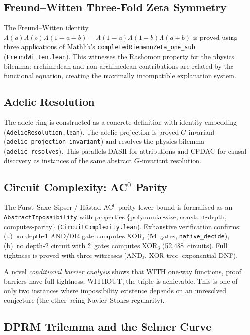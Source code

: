 \documentclass[11pt,a4paper]{article}
\begin{document}
\subsection{Freund--Witten Three-Fold Zeta Symmetry}

The Freund--Witten identity
$\Lambda(a)\Lambda(b)\Lambda(1{-}a{-}b) = \Lambda(1{-}a)\Lambda(1{-}b)\Lambda(a{+}b)$
is proved using three applications of Mathlib's \texttt{completedRiemannZeta\_one\_sub} (\texttt{FreundWitten.lean}).  This witnesses the Rashomon property for the physics bilemma: archimedean and non-archimedean contributions are related by the functional equation, creating the maximally incompatible explanation system.

\subsection{Adelic Resolution}

The adele ring is constructed as a concrete definition with identity embedding (\texttt{AdelicResolution.lean}).  The adelic projection is proved $G$-invariant (\texttt{adelic\_projection\_invariant}) and resolves the physics bilemma (\texttt{adelic\_resolves}).  This parallels DASH for attributions and CPDAG for causal discovery as instances of the same abstract $G$-invariant resolution.

\subsection{Circuit Complexity: AC$^0$ Parity}

The Furst--Saxe--Sipser / H\aa stad AC$^0$ parity lower bound is formalised as an \texttt{AbstractImpossibility} with properties \{polynomial-size, constant-depth, computes-parity\} (\texttt{CircuitComplexity.lean}).  Exhaustive verification confirms: (a)~no depth-1 AND/OR gate computes XOR$_3$ (54~gates, \texttt{native\_decide}); (b)~no depth-2 circuit with 2~gates computes XOR$_3$ (52,488~circuits).  Full tightness is proved with three witnesses (AND$_3$, XOR tree, exponential DNF).

A novel \emph{conditional barrier analysis} shows that WITH one-way functions, proof barriers have full tightness; WITHOUT, the triple is achievable.  This is one of only two instances where impossibility existence depends on an unresolved conjecture (the other being Navier--Stokes regularity).

\subsection{DPRM Trilemma and the Selmer Curve}
\end{document}
